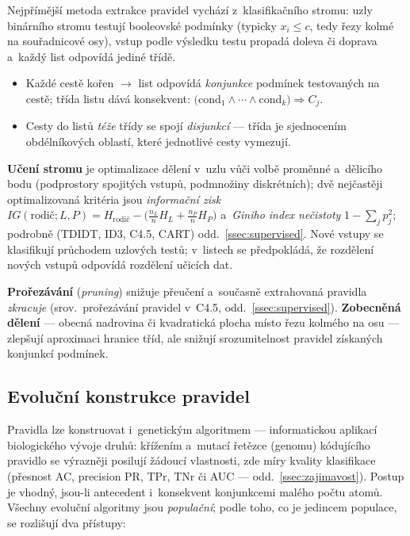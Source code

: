 \documentclass[11pt,a4paper]{article}
\theoremstyle{definition}
\begin{document}
Nejpřímější metoda extrakce pravidel vychází z~klasifikačního stromu: uzly binárního
stromu testují booleovské podmínky (typicky $x_i\le c$, tedy řezy kolmé na souřadnicové
osy), vstup podle výsledku testu propadá doleva či doprava a~každý list odpovídá jediné
třídě.

\begin{defbox}
\begin{itemize}
\item Každé cestě kořen $\to$ list odpovídá \emph{konjunkce} podmínek testovaných na
      cestě; třída listu dává konsekvent:
      $\big(\mathrm{cond}_1\wedge\cdots\wedge\mathrm{cond}_k\big)\Rightarrow C_j$.
\item Cesty do listů \emph{téže} třídy se spojí \emph{disjunkcí} --- třída je sjednocením
      obdélníkových oblastí, které jednotlivé cesty vymezují.
\end{itemize}
\end{defbox}

\textbf{Učení stromu} je optimalizace dělení v~uzlu vůči volbě proměnné a~dělicího bodu
(podprostory spojitých vstupů, podmnožiny diskrétních); dvě nejčastěji optimalizovaná
kritéria jsou \emph{informační zisk}
$IG(\text{rodič};L,P)=H_{\text{rodič}}-\big(\tfrac{n_L}{n}H_L+\tfrac{n_P}{n}H_P\big)$
a~\emph{Giniho index nečistoty} $1-\sum_j p_j^2$; podrobně (TDIDT, ID3, C4.5, CART)
odd.~\ref{ssec:supervised}. Nové vstupy se klasifikují průchodem uzlových testů;
v~listech se předpokládá, že rozdělení nových vstupů odpovídá rozdělení učicích dat.

\textbf{Prořezávání} (\emph{pruning}) snižuje přeučení a~současně extrahovaná pravidla
\emph{zkracuje} (srov.\ prořezávání pravidel v~C4.5, odd.~\ref{ssec:supervised}).
\textbf{Zobecněná dělení} --- obecná nadrovina či kvadratická plocha místo řezu kolmého
na osu --- zlepšují aproximaci hranice tříd, ale snižují srozumitelnost pravidel
získaných konjunkcí podmínek.

\subsection{Evoluční konstrukce pravidel}
\label{ssec:evoluce}

Pravidla lze konstruovat i~genetickým algoritmem --- informatickou aplikací biologického
vývoje druhů: křížením a~mutací řetězce (genomu) kódujícího pravidlo se výrazněji
posilují žádoucí vlastnosti, zde míry kvality klasifikace (přesnost AC, precision PR,
TPr, TNr či AUC --- odd.~\ref{ssec:zajimavost}). Postup je vhodný, jsou-li antecedent
i~konsekvent konjunkcemi malého počtu atomů. Všechny evoluční algoritmy jsou
\emph{populační}; podle toho, co je jedincem populace, se rozlišují dva přístupy:
\end{document}
